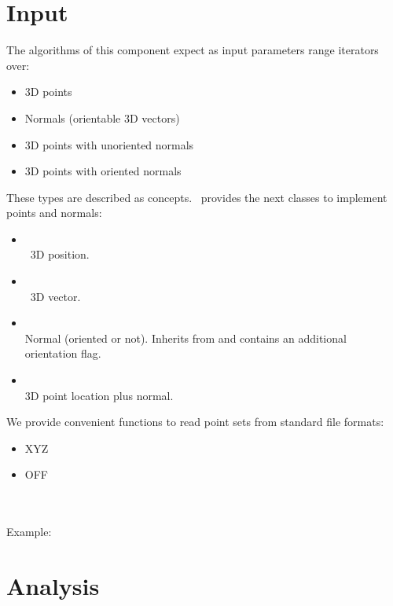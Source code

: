 \section{Input}

The algorithms of this component expect as input parameters range iterators over:

\begin{itemize}
\item 3D points
\item Normals (orientable 3D vectors)
\item 3D points with unoriented normals
\item 3D points with oriented normals
\end{itemize}

These types are described as concepts.
\cgal\ provides the next classes to implement points and normals:

\begin{itemize}
\item {} \\
\cgal\ 3D position.
\item {} \\
\cgal\ 3D vector.
\item {} \\
Normal (oriented or not). Inherits from  and contains an additional orientation flag.
\item {} \\
3D point location plus normal.
\end{itemize}

We provide convenient functions to read point sets from standard file formats:

\begin{itemize}
\item XYZ
\item OFF
\end{itemize}

  \\
  \\

Example:



\section{Analysis}

